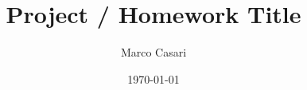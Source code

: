 \documentclass[a4paper,10pt,draft]{article}
\begin{document}
\title{Project / Homework Title}
\author{Marco Casari}
\date{\today}
\maketitle

\tableofcontents %
\newpage

\end{document}
